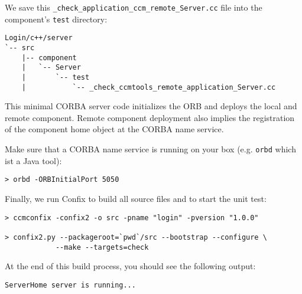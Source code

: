 We save this {\tt \_check\_application\_ccm\_remote\_Server.cc} file
into the component's {\tt test} directory:
\begin{footnotesize}
\begin{verbatim}
Login/c++/server
`-- src
    |-- component
    |   `-- Server
    |       `-- test
    |           `-- _check_ccmtools_remote_application_Server.cc
\end{verbatim}
\end{footnotesize}

This minimal CORBA server code initializes the ORB and deploys the local and
remote component. Remote component deployment also implies the registration of
the component home object at the CORBA name service. 

\vspace{3mm}
Make sure that a CORBA name service is running on your box (e.g. {\tt orbd}
which ist a Java tool):
\begin{footnotesize}
\begin{verbatim}
> orbd -ORBInitialPort 5050
\end{verbatim}
\end{footnotesize}

Finally, we run Confix to build all source files and to start the unit test:
\begin{footnotesize}
\begin{verbatim}
> ccmconfix -confix2 -o src -pname "login" -pversion "1.0.0"

> confix2.py --packageroot=`pwd`/src --bootstrap --configure \
            --make --targets=check
\end{verbatim}
\end{footnotesize}

At the end of this build process, you should see the following output:
\begin{footnotesize}
\begin{verbatim}
ServerHome server is running...
\end{verbatim}
\end{footnotesize}


